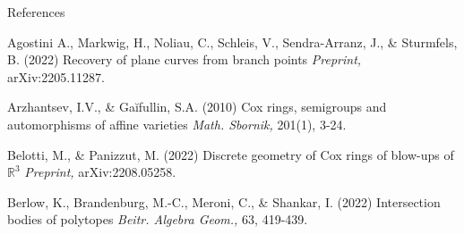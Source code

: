 \documentclass[aspectratio=169,xcolor=dvipsnames]{beamer}
\begin{document}






\begin{frame}{References}
    \footnotesize{
        \begin{thebibliography}{99}
             Agostini A., Markwig, H., Noliau, C., Schleis, V., Sendra-Arranz, J., \& Sturmfels, B. (2022)
            \newblock Recovery of plane curves from branch points
            \newblock \emph{Preprint,} arXiv:2205.11287.
        \end{thebibliography}
        \begin{thebibliography}{99}
             Arzhantsev, I.V., \& Gaĭfullin, S.A. (2010)
            \newblock Cox rings, semigroups and automorphisms of affine varieties
            \newblock \emph{Math. Sbornik,} 201(1), 3-24.
        \end{thebibliography}
        \begin{thebibliography}{99}
             Belotti, M., \& Panizzut, M. (2022)
            \newblock Discrete geometry of Cox rings of blow-ups of $\mathbb{R}^3$
            \newblock \emph{Preprint,} arXiv:2208.05258.
        \end{thebibliography}
        \begin{thebibliography}{99}
             Berlow, K., Brandenburg, M.-C., Meroni, C., \& Shankar, I. (2022)
            \newblock  Intersection bodies of polytopes
            \newblock \emph{Beitr. Algebra Geom.,} 63, 419-439.
        \end{thebibliography}
    }
\end{frame}
\end{document}
